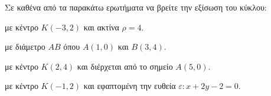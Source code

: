 Σε καθένα από τα παρακάτω ερωτήματα να βρείτε την εξίσωση του κύκλου:
\begin{alist}
\item με κέντρο $ K(-3,2) $ και ακτίνα $ \rho=4 $.
\item με διάμετρο $ AB $ όπου $ A(1,0) $ και $ B(3,4) $.
\item με κέντρο $ Κ(2,4) $ και διέρχεται από το σημείο $ A(5,0) $.
\item με κέντρο $ K(-1,2) $ και εφαπτομένη την ευθεία $ \varepsilon: x+2y-2=0 $.
\end{alist}
